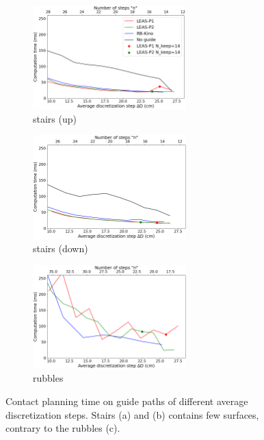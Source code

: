 \begin{figure}[h!]
    \centering
    \captionsetup[subfigure]{justification=centering}
    \begin{subfigure}[t]{0.32\linewidth}
    \includegraphics[trim={0cm 0cm 0cm 0cm}, clip,width=\textwidth, height=4cm]{Figures/Chapter_MIP_SL1M/res_mip/MIP_stairs_with_cbm/stairs_nb.png}
    \caption{stairs (up)}
    \label{fig:mip:minimizing_basic:time:0}
    \end{subfigure}
    \begin{subfigure}[t]{0.32\linewidth}
    \includegraphics[trim={0cm 0cm 0cm 0cm}, clip,width=\textwidth, height=4cm]{Figures/Chapter_MIP_SL1M/res_mip/MIP_stairs_with_cbm/stairs_down_nb.png}
    \caption{stairs (down)}
    \label{fig:mip:minimizing_basic:time:1}
    \end{subfigure}
    \begin{subfigure}[t]{0.32\linewidth}
    \includegraphics[trim={0cm 0cm 0cm 0cm}, clip,width=\textwidth, height=4cm]{Figures/Chapter_MIP_SL1M/res_mip/time_rubbles.png}
    \caption{rubbles}
    \label{fig:mip:minimizing_basic:time:2}
    \end{subfigure}
    \caption{Contact planning time on guide paths of different average discretization steps. Stairs (a) and (b) contains few surfaces, contrary to the rubbles (c).}
    \label{fig:mip:minimizing_basic:time}
\end{figure}

